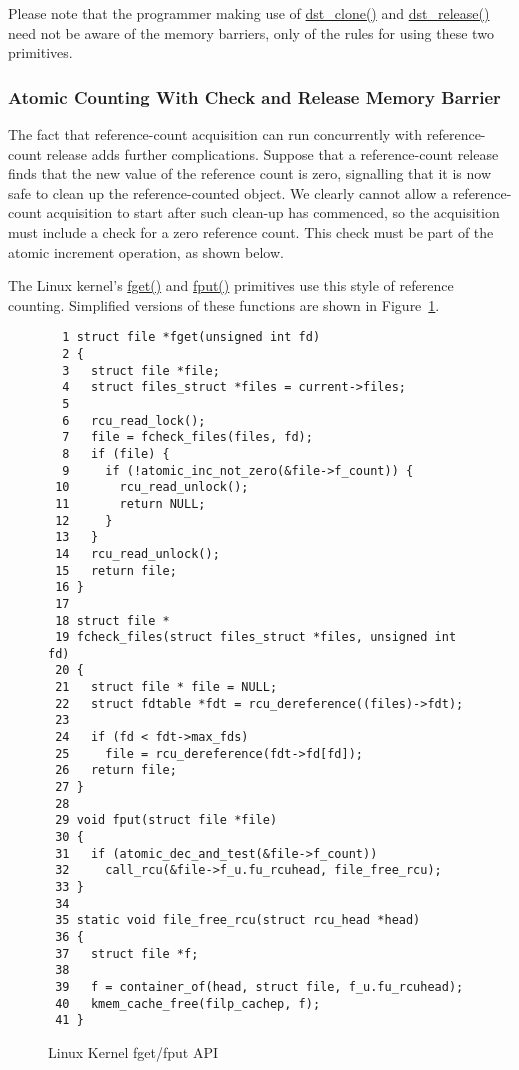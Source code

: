 Please note that the programmer making use of \url{dst_clone()} and
\url{dst_release()} need not be aware of the memory barriers, only
of the rules for using these two primitives.

\subsubsection{Atomic Counting With Check and Release Memory Barrier}
\label{sec:defer:Atomic Counting With Check and Release Memory Barrier}

The fact that reference-count acquisition can run concurrently
with reference-count release adds further complications.
Suppose that a reference-count release finds that the new
value of the reference count is zero, signalling that it is
now safe to clean up the reference-counted object.
We clearly cannot allow a reference-count acquisition to
start after such clean-up has commenced, so the acquisition
must include a check for a zero reference count.
This check must be part of the atomic increment operation,
as shown below.

 \QuickQuizEnd

The Linux kernel's \url{fget()} and \url{fput()} primitives
use this style of reference counting.
Simplified versions of these functions are shown in
Figure~\ref{fig:defer:Linux Kernel fget/fput API}.

\begin{figure}[htbp]
{ \scriptsize
\begin{verbatim}
  1 struct file *fget(unsigned int fd)
  2 {
  3   struct file *file;
  4   struct files_struct *files = current->files;
  5 
  6   rcu_read_lock();
  7   file = fcheck_files(files, fd);
  8   if (file) {
  9     if (!atomic_inc_not_zero(&file->f_count)) {
 10       rcu_read_unlock();
 11       return NULL;
 12     }
 13   }
 14   rcu_read_unlock();
 15   return file;
 16 }
 17 
 18 struct file *
 19 fcheck_files(struct files_struct *files, unsigned int fd)
 20 {
 21   struct file * file = NULL;
 22   struct fdtable *fdt = rcu_dereference((files)->fdt);
 23 
 24   if (fd < fdt->max_fds)
 25     file = rcu_dereference(fdt->fd[fd]);
 26   return file;
 27 }
 28 
 29 void fput(struct file *file)
 30 {
 31   if (atomic_dec_and_test(&file->f_count))
 32     call_rcu(&file->f_u.fu_rcuhead, file_free_rcu);
 33 }
 34 
 35 static void file_free_rcu(struct rcu_head *head)
 36 {
 37   struct file *f;
 38   
 39   f = container_of(head, struct file, f_u.fu_rcuhead);
 40   kmem_cache_free(filp_cachep, f);
 41 }
\end{verbatim}
}
\caption{Linux Kernel fget/fput API}
\label{fig:defer:Linux Kernel fget/fput API}
\end{figure}


